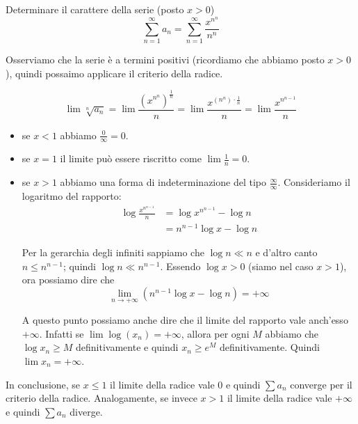 \begin{example}
Determinare il carattere della serie (posto $x > 0$)
\begin{equation*}
\sum_{n=1}^\infty a_n = \sum_{n=1}^\infty \frac{x^{n^n}}{n^n}
\end{equation*}

Osserviamo che la serie è a termini positivi (ricordiamo che abbiamo posto $x > 0$), quindi possaimo applicare il criterio della radice.

\begin{equation*}
\lim \sqrt[n]{a_n} = \lim \frac{(x^{{n^n}})^\frac{1}{n}}{n} = \lim \frac{x^{(n^n) \cdot \frac{1}{n}}}{n} = \lim \frac{x^{n^{n-1}}}{n}
\end{equation*}

\begin{itemize}
\item se $x < 1$ abbiamo $\frac{0}{\infty} = 0$.
\item se $x = 1$ il limite può essere riscritto come $\lim \frac{1}{n} = 0$.
\item se $x > 1$ abbiamo una forma di indeterminazione del tipo $\frac{\infty}{\infty}$. Consideriamo il logaritmo del rapporto:
\begin{align*}
\log \frac{x^{n^{n-1}}}{n} &= \log x^{n^{n-1}} - \log n \\
&= n^{n-1} \log x - \log n
\end{align*}

Per la gerarchia degli infiniti sappiamo che $\log n \ll n$ e d'altro canto $n \le n^{n-1}$; quindi $\log n \ll n^{n-1}$. Essendo $\log x > 0$ (siamo nel caso $x > 1$), ora possiamo dire che
\begin{equation*}
\lim_{n \to +\infty} (n^{n-1} \log x - \log n) = +\infty
\end{equation*}

A questo punto possiamo anche dire che il limite del rapporto vale anch'esso $+\infty$. Infatti se $\lim \log (x_n) = +\infty$, allora per ogni $M$ abbiamo che $\log x_n \ge M$ definitivamente e quindi $x_n \ge e^M$ definitivamente. Quindi $\lim x_n = +\infty$.

\end{itemize}

In conclusione, se $x \le 1$ il limite della radice vale 0 e quindi $\sum a_n$ converge per il criterio della radice. Analogamente, se invece $x > 1$ il limite della radice vale $+\infty$ e quindi $\sum a_n$ diverge.
\end{example}

